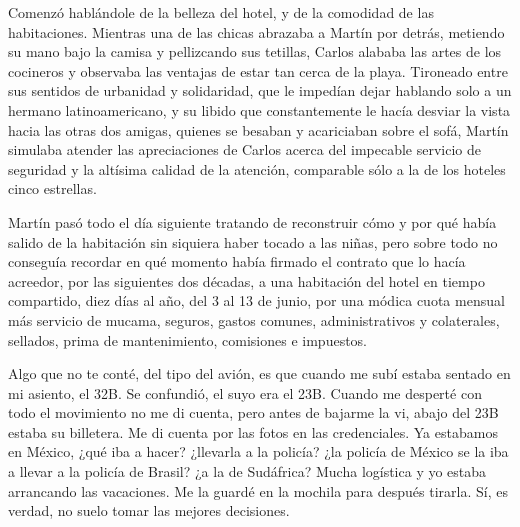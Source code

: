 \documentclass[12pt,twoside,openright,a5paper]{book}
\begin{document}
Comenzó hablándole de la belleza del hotel, y de la comodidad de las
habitaciones. Mientras una de las chicas abrazaba a Martín por detrás,
metiendo su mano bajo la camisa y pellizcando sus tetillas, Carlos alababa
las artes de los cocineros y observaba las ventajas de estar tan cerca de
la playa. Tironeado entre sus sentidos de urbanidad y solidaridad, que le
impedían dejar hablando solo a un hermano latinoamericano, y su libido
que constantemente le hacía desviar la vista hacia las otras dos amigas,
quienes se besaban y acariciaban sobre el sofá, Martín simulaba atender
las apreciaciones de Carlos acerca del impecable servicio de seguridad y
la altísima calidad de la atención, comparable sólo a la de los hoteles
cinco estrellas.

Martín pasó todo el día siguiente tratando de reconstruir cómo y por qué
había salido de la habitación sin siquiera haber tocado a las niñas, pero
sobre todo no conseguía recordar en qué momento había firmado el contrato
que lo hacía acreedor, por las siguientes dos décadas, a una habitación
del hotel en tiempo compartido, diez días al año, del 3 al 13 de junio,
por una módica cuota mensual más servicio de mucama, seguros, gastos
comunes, administrativos y colaterales, sellados, prima de mantenimiento,
comisiones e impuestos.


\vspace{0.5cm}
\hrulefill\hspace{0.2cm} \decofourleft\decofourright \hspace{0.2cm} \hrulefill
\vspace{0.5cm}

Algo que no te conté, del tipo del avión, es que cuando me subí estaba
sentado en mi asiento, el 32B. Se confundió, el suyo era el 23B. Cuando
me desperté con todo el movimiento no me di cuenta, pero antes de bajarme
la vi, abajo del 23B estaba su billetera. Me di cuenta por las fotos en
las credenciales. Ya estabamos en México, ¿qué iba a hacer? ¿llevarla
a la policía? ¿la policía de México se la iba a llevar a la policía
de Brasil? ¿a la de Sudáfrica? Mucha logística y yo estaba arrancando
las vacaciones. Me la guardé en la mochila para después tirarla. Sí,
es verdad, no suelo tomar las mejores decisiones.


\vspace{0.5cm}
\hrulefill\hspace{0.2cm} \decofourleft\decofourright \hspace{0.2cm} \hrulefill
\vspace{0.5cm}
\end{document}
